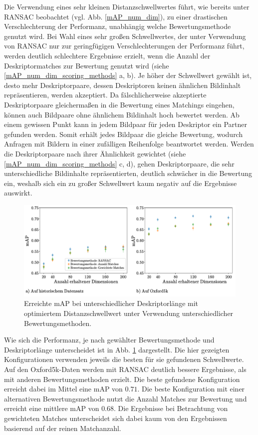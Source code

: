 Die Verwendung eines sehr kleinen Distanzschwellwertes führt, wie bereits unter RANSAC beobachtet (vgl. Abb. \ref{mAP_num_dim}), zu einer drastischen Verschlechterung der Performanz, unabhängig welche Bewertungsmethode genutzt wird. Bei Wahl eines sehr großen Schwellwertes, der unter Verwendung von RANSAC nur zur geringfügigen Verschlechterungen der Performanz führt, werden deutlich schlechtere Ergebnisse erzielt, wenn die Anzahl der Deskriptormatches zur Bewertung genutzt wird (siehe \ref{mAP_num_dim_scoring_methods} a, b). Je höher der Schwellwert gewählt ist, desto mehr Deskriptorpaare, dessen Deskriptoren keinen ähnlichen Bildinhalt repräsentieren, werden akzeptiert. Da fälschlicherweise akzeptierte Deskriptorpaare gleichermaßen in die Bewertung eines Matchings eingehen, können auch Bildpaare ohne ähnlichem Bildinhalt hoch bewertet werden. Ab einem gewissen Punkt kann in jedem Bildpaar für jeden Deskriptor ein Partner gefunden werden. Somit erhält jedes Bildpaar die gleiche Bewertung, wodurch Anfragen mit Bildern in einer zufälligen Reihenfolge beantwortet werden. Werden die Deskriptorpaare nach ihrer Ähnlichkeit gewichtet (siehe \ref{mAP_num_dim_scoring_methods} c, d), gehen Deskriptorpaare, die sehr unterschiedliche Bildinhalte repräsentierten, deutlich schwächer in die Bewertung ein, weshalb sich ein zu großer Schwellwert kaum negativ auf die Ergebnisse auswirkt.
\\
\begin{figure}[h]
\includegraphics[scale=0.74]{compare_scoring_methods}
\caption{Erreichte mAP bei unterschiedlicher Deskriptorlänge mit optimiertem Distanzschwellwert unter Verwendung unterschiedlicher Bewertungsmethoden.}
\label{compare_scoring_methods}
\end{figure}
Wie sich die Performanz, je nach gewählter Bewertungsmethode und Deskriptorlänge unterscheidet ist in Abb. \ref{compare_scoring_methods} dargestellt. Die hier gezeigten Konfigurationen verwenden jeweils die besten für sie gefundenen Schwellwerte. Auf den Oxford5k-Daten werden mit RANSAC deutlich bessere Ergebnisse, als mit anderen Bewertungsmethoden erzielt. Die beste gefundene Konfiguration erreicht dabei im Mittel eine mAP von $0.71$. Die beste Konfiguration mit einer alternativen Bewertungsmethode nutzt die Anzahl Matches zur Bewertung und erreicht eine mittlere mAP von $0.68$. Die Ergebnisse bei Betrachtung von gewichteten Matches unterscheidet sich dabei kaum von den Ergebnissen basierend auf der reinen Matchanzahl.
